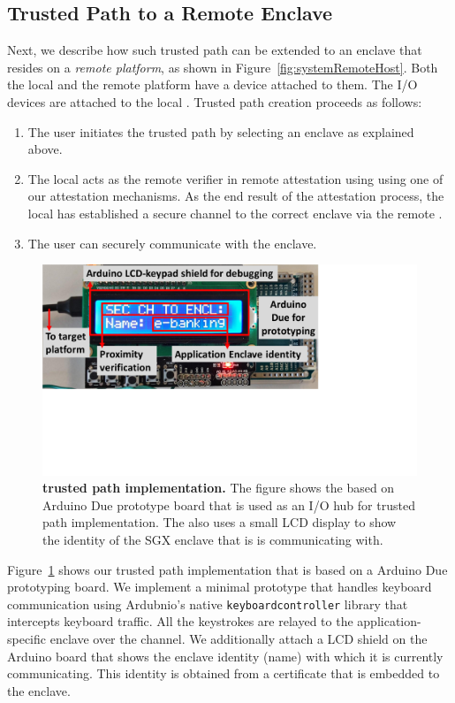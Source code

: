 \subsection{Trusted Path to a Remote Enclave} 

Next, we describe how such trusted path can be extended to an enclave that resides on a \emph{remote platform}, as shown in Figure~\ref{fig:systemRemoteHost}. Both the local and the remote platform have a \device device attached to them. The I/O devices are attached to the local \device. Trusted path creation proceeds as follows:

\begin{enumerate}
	\item[\one] The user initiates the trusted path by selecting an enclave as explained above.
	\item[\two] The local \device acts as the remote verifier in remote attestation using using one of our attestation mechanisms. As the end result of the attestation process, the local \device has established a secure channel to the correct enclave via the remote \device.
	\item[\three] The user can securely communicate with the enclave.
\end{enumerate}

 
\begin{figure}[t]
  \centering
    \includegraphics[trim={0 7.5cm 9cm 0}, clip, width=0.7\linewidth]{chapters/ProximiTEE/images/Setup1.pdf}
    \caption[\name trusted path implementation]{\textbf{\name trusted path implementation.} The figure shows the \device based on Arduino Due prototype board that is used as an I/O hub for trusted path implementation. The \device also uses a small LCD display to show the identity of the SGX enclave that is is communicating with.}
    \label{fig:trustedPathImplementation}
\end{figure}


Figure~\ref{fig:trustedPathImplementation} shows our trusted path implementation that is based on a Arduino Due prototyping board. We implement a minimal prototype that handles keyboard communication using Ardubnio's native \texttt{keyboardcontroller} library that intercepts keyboard traffic. All the keystrokes are relayed to the application-specific enclave over the \tls channel. 
%
We additionally attach a LCD shield on the Arduino board that shows the enclave identity (name) with which it is currently communicating. This identity is obtained from a certificate that is embedded to the enclave.



